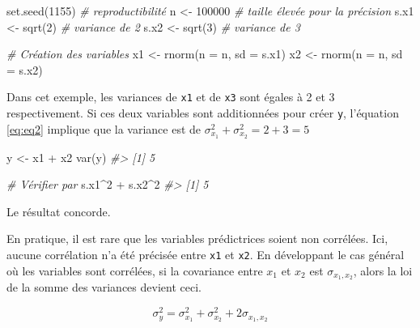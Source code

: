 \documentclass[
]{book}
\newenvironment{Shaded}{}{}
\newcommand{\AttributeTok}[1]{#1}
\newcommand{\CommentTok}[1]{\textit{#1}}
\newcommand{\DecValTok}[1]{#1}
\newcommand{\FunctionTok}[1]{#1}
\newcommand{\NormalTok}[1]{#1}
\newcommand{\OtherTok}[1]{#1}
\newcommand{\SpecialCharTok}[1]{#1}
\begin{document}
\begin{Shaded}
\begin{Highlighting}[]
\FunctionTok{set.seed}\NormalTok{(}\DecValTok{1155}\NormalTok{)                  }\CommentTok{\# reproductibilité}
\NormalTok{n }\OtherTok{\textless{}{-}} \DecValTok{100000}                      \CommentTok{\# taille élevée pour la précision}
\NormalTok{s.x1 }\OtherTok{\textless{}{-}} \FunctionTok{sqrt}\NormalTok{(}\DecValTok{2}\NormalTok{)                  }\CommentTok{\# variance de 2 }
\NormalTok{s.x2 }\OtherTok{\textless{}{-}} \FunctionTok{sqrt}\NormalTok{(}\DecValTok{3}\NormalTok{)                  }\CommentTok{\# variance de 3}

\CommentTok{\# Création des variables}
\NormalTok{x1 }\OtherTok{\textless{}{-}} \FunctionTok{rnorm}\NormalTok{(}\AttributeTok{n =}\NormalTok{ n, }\AttributeTok{sd =}\NormalTok{ s.x1) }
\NormalTok{x2 }\OtherTok{\textless{}{-}} \FunctionTok{rnorm}\NormalTok{(}\AttributeTok{n =}\NormalTok{ n, }\AttributeTok{sd =}\NormalTok{ s.x2)     }
\end{Highlighting}
\end{Shaded}

Dans cet exemple, les variances de \texttt{x1} et de \texttt{x3} sont égales à 2 et 3 respectivement. Si ces deux variables sont additionnées pour créer \texttt{y}, l'équation \eqref{eq:eq2} implique que la variance est de \(\sigma^2_{x_{1}} + \sigma^2_{x_2} = 2 + 3= 5\)

\begin{Shaded}
\begin{Highlighting}[]
\NormalTok{y }\OtherTok{\textless{}{-}}\NormalTok{ x1 }\SpecialCharTok{+}\NormalTok{ x2}
\FunctionTok{var}\NormalTok{(y)}
\CommentTok{\#\textgreater{} [1] 5}

\CommentTok{\# Vérifier par}
\NormalTok{s.x1}\SpecialCharTok{\^{}}\DecValTok{2} \SpecialCharTok{+}\NormalTok{ s.x2}\SpecialCharTok{\^{}}\DecValTok{2}
\CommentTok{\#\textgreater{} [1] 5}
\end{Highlighting}
\end{Shaded}

Le résultat concorde.

En pratique, il est rare que les variables prédictrices soient non corrélées. Ici, aucune corrélation n'a été précisée entre \texttt{x1} et \texttt{x2}. En développant le cas général où les variables sont corrélées, si la covariance entre \(x_1\) et \(x_2\) est \(\sigma_{x_1,x_2}\), alors la loi de la somme des variances devient ceci.

\begin{equation}
\sigma_y^2=\sigma_{x_1}^2+\sigma_{x_2}^2+2\sigma_{x_1,x_2}
\label{eq:eq3}
\end{equation}
\end{document}
